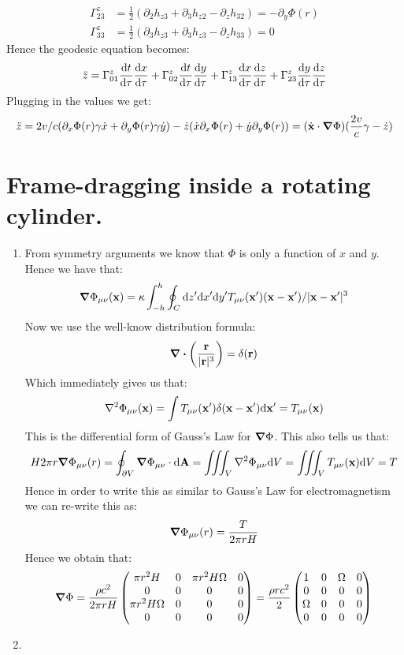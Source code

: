 \documentclass[10pt,a4paper]{article}
\begin{document}
\begin{enumerate}
\begin{enumerate}
\begin{align*}
\Gamma^{z}_{23} &= \frac{1}{2}(\partial_2 h_{z 3} + \partial_3 h_{z2} - \partial_z h_{32}) = - \partial_y \Phi(r)\\
\Gamma^z_{33} &= \frac{1}{2} (\partial_{3} h_{z3} + \partial_3 h_{z3} - \partial_z h_{33}) = 0
\end{align*}
Hence the geodesic equation becomes:
\[
\ddot{z} = \Gamma^z_{01} \dv{t}{\tau} \dv{x}{\tau} + \Gamma^z_{02} \dv{t}{\tau} \dv{y}{\tau} + \Gamma^z_{13} \dv{x}{\tau}\dv{z}{\tau} + \Gamma^z_{23} \dv{y}{\tau}\dv{z}{\tau}
\]
Plugging in the values we get:
\[
\ddot{z} = 2v/c( \partial_x \Phi(r) \gamma \dot{x} + \partial_y \Phi(r) \gamma \dot{y}) - \dot{z}( \dot{x} \partial_x \Phi(r)  + \dot{y}\partial_y \Phi(r)  )  = (\dot{\vb{x}} \cdot \grad \Phi) (\frac{2v}{c} \gamma - \dot{z})
\]

\end{enumerate}


\end{enumerate}

\section{Frame-dragging inside a rotating cylinder.}

\begin{enumerate}

\item From symmetry arguments we know that $\Phi$ is only a function of $x$ and $y$. Hence we have that:
\[
\grad \Phi_{\mu \nu}(\vb{x}) = \kappa \int_{-h}^{h} \oint_C \dd z' \dd x' \dd y' T_{\mu \nu}(\vb{x}') (\vb{x} - \vb{x'})/|\vb{x} - \vb{x'}|^3 
\]
Now we use the well-know distribution formula:
\[
\div \left( \frac{\vb{r}}{|\vb{r}|^3} \right) = \delta(\vb{r})
\]
Which immediately gives us that:
\[
\laplacian \Phi_{\mu \nu}(\vb{x}) = \int T_{\mu \nu}(\vb{x'}) \delta(\vb{x} - \vb{x'}) \dd \vb{x'} = T_{\mu \nu}(\vb{x})
\]
This is the differential form of Gauss's Law for $\grad\Phi$. This also tells us that:
\[
H 2 \pi r \grad \Phi_{\mu \nu}(r) = \oint_{\partial V} \grad \Phi_{\mu \nu} \cdot \dd \vb{A} = \iiint_V \laplacian \Phi_{\mu \nu} \dd V = \iiint_V T_{\mu \nu}(\vb{x}) \dd V = T
\]
Hence in order to write this as similar to Gauss's Law for electromagnetism we can re-write this as:
\[
\grad \Phi_{\mu \nu}(r) = \frac{T}{2\pi r H}
\]
Hence we obtain that:
\[
\grad \Phi = \frac{\rho c^2}{2\pi r H} \begin{pmatrix}
\pi r^2 H & 0 & \pi r^2 H \Omega & 0\\
0 & 0 & 0 & 0\\
\pi r^2 H \Omega & 0 & 0 & 0\\
0 & 0 & 0 & 0
\end{pmatrix} = \frac{\rho r c^2}{2} \begin{pmatrix}
1 & 0 & \Omega & 0\\
0 & 0 & 0 & 0\\
\Omega & 0 & 0 & 0\\
0 & 0 & 0 & 0
\end{pmatrix}
\]

\item 

\end{enumerate}
\end{document}
